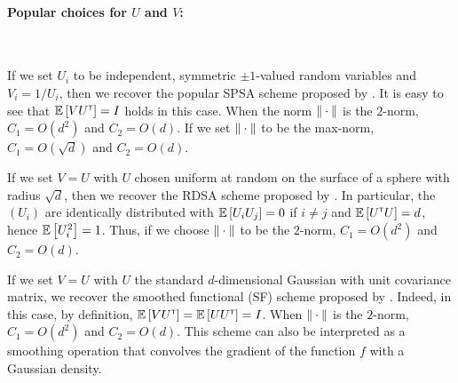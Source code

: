 
\paragraph{Popular choices for $U$ and $V$:}\ \\
\begin{inparaenum}[$\bullet$]
 \item If we set $U_i$ to be independent, symmetric $\pm 1$-valued random variables and $V_i = 1/U_i$, then we recover the popular SPSA scheme proposed by \cite{spall1992multivariate}.
It is easy to see that $\mathbb{E}\left[  V U^\mathsf{\scriptscriptstyle T} \right] = I$ holds in this case.
 When the norm $\|\cdot\|$ is the $2$-norm, $C_1 = O(d^2)$ and $C_2 = O(d)$. If we set $\|\cdot\|$ to be the max-norm, $C_1 = O(\sqrt{d})$ and $C_2 = O(d)$.\\
 \item If we set $V=U$ with $U$ chosen uniform at random on the surface of a sphere with radius $\sqrt{d}$,
 then we recover the RDSA scheme proposed by  \citet[pp.~58--60]{kushcla}.
 In particular, the $(U_i)$ are identically distributed with $\mathbb{E}\left[ U_i U_j \right] = 0$ if $i\ne j$ and $\mathbb{E}\left[ U^\mathsf{\scriptscriptstyle T} U \right] = d$, hence $\mathbb{E}\left[U_i^2\right] = 1$. Thus, if we choose $\|\cdot\|$ to be the $2$-norm, $C_1 = O( d^2 )$ and $C_2 = O(d)$.\\
 \item If we set $V=U$ with $U$ the standard $d$-dimensional Gaussian with unit covariance matrix, we recover the smoothed functional (SF) scheme proposed by \cite{katkul}.
Indeed, in this case, by definition, $\mathbb{E}\left[VU^\mathsf{\scriptscriptstyle T}\right] = \mathbb{E}\left[U U^\mathsf{\scriptscriptstyle T} \right] = I$.
When $\|\cdot\|$ is the $2$-norm, $C_1 = O(d^2)$
 and $C_2 = O( d)$.
 This scheme can also be interpreted as a smoothing operation that  convolves the gradient of the function $f$ with a Gaussian density.
\end{inparaenum}


